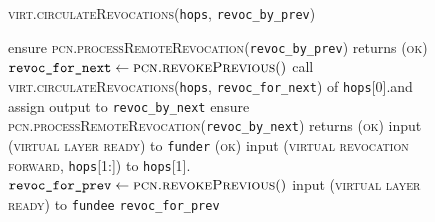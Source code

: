 \begin{figure}[H]
  \begin{processbox}{\textsc{virt.circulateRevocations}(\texttt{hops},
  \texttt{revoc\_by\_prev})}
    \begin{algorithmic}[1]
     
      \State ensure
      \textsc{pcn.processRemoteRevocation}(\texttt{revoc\_by\_prev}) returns
      (\textsc{ok})
    \Else \: 
      \State $\texttt{revoc\_for\_next} \gets \textsc{pcn.revokePrevious}()$
      \State call \textsc{virt.circulateRevocations}(\texttt{hops},
      \texttt{revoc\_for\_next}) of \texttt{hops}[0].\bob and assign output to
      \texttt{revoc\_by\_next}
      \State ensure
      \textsc{pcn.processRemoteRevocation}(\texttt{revoc\_by\_next}) returns
      (\textsc{ok})
      \State input (\textsc{virtual layer ready}) to \texttt{funder}
      \State {} 
      \State {}
      \State \Return (\textsc{ok})
    \EndIf
     
      \State input (\textsc{virtual revocation forward}, \texttt{hops}[1:]) to
      \texttt{hops}[1].\alice
      \State {}
      \State {}
      \State {}
      \State {}
    \EndIf
    \State $\texttt{revoc\_for\_prev} \gets \textsc{pcn.revokePrevious}()$
     
      \State input (\textsc{virtual layer ready}) to \texttt{fundee}
      \State {} 
      \State {}
    \EndIf
    \State \Return \texttt{revoc\_for\_prev}
    \end{algorithmic}
  \end{processbox}
  \caption{}
  \label{code:virtual-layer:revocation}
\end{figure}

